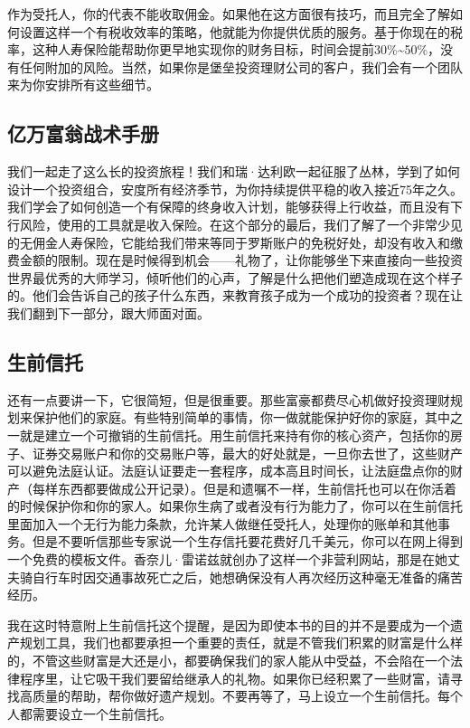 作为受托人，你的代表不能收取佣金。如果他在这方面很有技巧，而且完全了解如何设置这样一个有税收效率的策略，他就能为你提供优质的服务。基于你现在的税率，这种人寿保险能帮助你更早地实现你的财务目标，时间会提前30\%\textasciitilde{}50\%，没有任何附加的风险。当然，如果你是堡垒投资理财公司的客户，我们会有一个团队来为你安排所有这些细节。

\subsection{亿万富翁战术手册}

我们一起走了这么长的投资旅程！我们和瑞·达利欧一起征服了丛林，学到了如何设计一个投资组合，安度所有经济季节，为你持续提供平稳的收入接近75年之久。我们学会了如何创造一个有保障的终身收入计划，能够获得上行收益，而且没有下行风险，使用的工具就是收入保险。在这个部分的最后，我们了解了一个非常少见的无佣金人寿保险，它能给我们带来等同于罗斯账户的免税好处，却没有收入和缴费金额的限制。现在是时候得到机会——礼物了，让你能够坐下来直接向一些投资世界最优秀的大师学习，倾听他们的心声，了解是什么把他们塑造成现在这个样子的。他们会告诉自己的孩子什么东西，来教育孩子成为一个成功的投资者？现在让我们翻到下一部分，跟大师面对面。

\subsection{生前信托}

还有一点要讲一下，它很简短，但是很重要。那些富豪都费尽心机做好投资理财规划来保护他们的家庭。有些特别简单的事情，你一做就能保护好你的家庭，其中之一就是建立一个可撤销的生前信托。用生前信托来持有你的核心资产，包括你的房子、证券交易账户和你的交易账户等，最大的好处就是，一旦你去世了，这些财产可以避免法庭认证。法庭认证要走一套程序，成本高且时间长，让法庭盘点你的财产（每样东西都要做成公开记录）。但是和遗嘱不一样，生前信托也可以在你活着的时候保护你和你的家人。如果你生病了或者没有行为能力了，你可以在生前信托里面加入一个无行为能力条款，允许某人做继任受托人，处理你的账单和其他事务。但是不要听信那些专家说一个生存信托要花费好几千美元，你可以在网上得到一个免费的模板文件。香奈儿·雷诺兹就创办了这样一个非营利网站，那是在她丈夫骑自行车时因交通事故死亡之后，她想确保没有人再次经历这种毫无准备的痛苦经历。

我在这时特意附上生前信托这个提醒，是因为即使本书的目的并不是要成为一个遗产规划工具，我们也都要承担一个重要的责任，就是不管我们积累的财富是什么样的，不管这些财富是大还是小，都要确保我们的家人能从中受益，不会陷在一个法律程序里，让它吸干我们要留给继承人的礼物。如果你已经积累了一些财富，请寻找高质量的帮助，帮你做好遗产规划。不要再等了，马上设立一个生前信托。每个人都需要设立一个生前信托。
